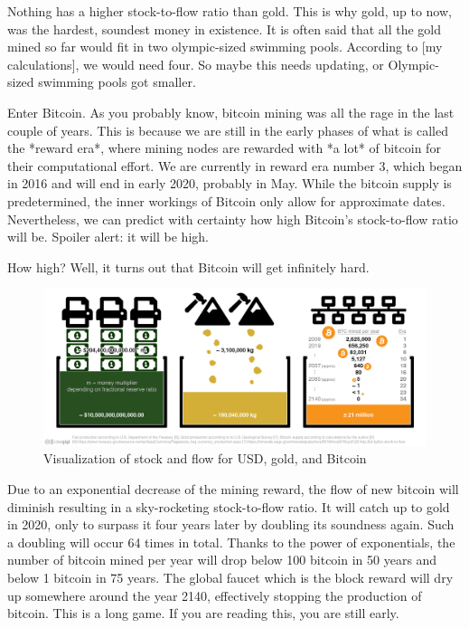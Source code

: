 Nothing has a higher stock-to-flow ratio than gold. This is why gold, up
to now, was the hardest, soundest money in existence. It is often said
that all the gold mined so far would fit in two olympic-sized swimming
pools. According to [my calculations], we would need four. So maybe this
needs updating, or Olympic-sized swimming pools got smaller.

Enter Bitcoin. As you probably know, bitcoin mining was all the rage in
the last couple of years. This is because we are still in the early
phases of what is called the *reward era*, where mining nodes are
rewarded with *a lot* of bitcoin for their computational effort. We are
currently in reward era number 3, which began in 2016 and will end in
early 2020, probably in May. While the bitcoin supply is predetermined,
the inner workings of Bitcoin only allow for approximate dates.
Nevertheless, we can predict with certainty how high Bitcoin's
stock-to-flow ratio will be. Spoiler alert: it will be high.

How high? Well, it turns out that Bitcoin will get infinitely hard.

\begin{figure}
  \includegraphics{assets/images/stock-to-flow-white-cc-by-sources.png}
  \caption{Visualization of stock and flow for USD, gold, and Bitcoin}
  \label{fig:stock-to-flow-white-cc-by-sources}
\end{figure}

Due to an exponential decrease of the mining reward, the flow of new
bitcoin will diminish resulting in a sky-rocketing stock-to-flow ratio.
It will catch up to gold in 2020, only to surpass it four years later by
doubling its soundness again. Such a doubling will occur 64 times in
total. Thanks to the power of exponentials, the number of bitcoin mined
per year will drop below 100 bitcoin in 50 years and below 1 bitcoin in
75 years. The global faucet which is the block reward will dry up
somewhere around the year 2140, effectively stopping the production of
bitcoin. This is a long game. If you are reading this, you are still
early.

